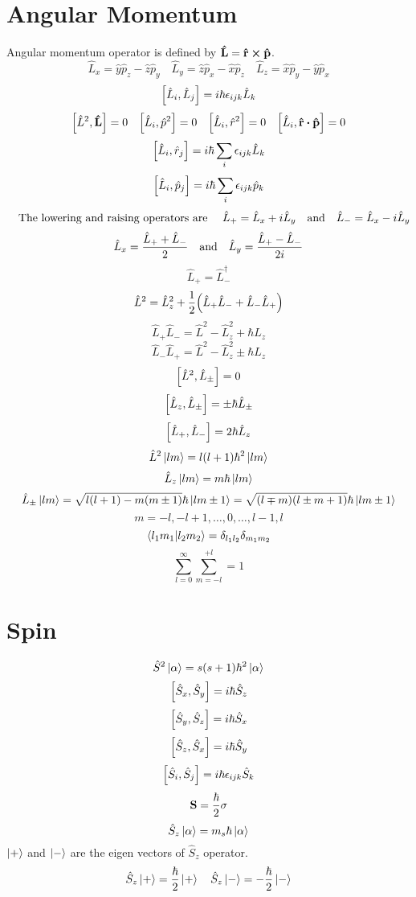 \documentclass[12pt]{article}
\begin{document}
\section{Angular Momentum}
Angular momentum operator is defined by $\vb{\vu{L}}=\vb{\vu{r}}\cp\vb{\vu{p}}$.
\[\hat{L}_x=\hat{y}\hat{p}_z-\hat{z}\hat{p}_y\quad\hat{L}_y=\hat{z}\hat{p}_x-\hat{x}\hat{p}_z\quad\hat{L}_z=\hat{x}\hat{p}_y-\hat{y}\hat{p}_x\]
\[\comm{\hat{L}_i}{\hat{L}_j}=i\hbar\epsilon_{ijk}\hat{L}_k\]
\[\comm{\hat{L}^2}{\vb{\vu{L}}}=0\quad\comm{\hat{L}_i}{\hat{p}^2}=0\quad\comm{\hat{L}_i}{\hat{r}^2}=0\quad\comm{\hat{L}_i}{\vb{\vu{r}}\vdot\vb{\vu{p}}}=0\]
\[\comm{\hat{L}_i}{\hat{r}_j}=i\hbar\sum_{i}\epsilon_{ijk}\hat{L}_k\]
\[\comm{\hat{L}_i}{\hat{p}_j}=i\hbar\sum_{i}\epsilon_{ijk}\hat{p}_k\]
\[\qq{The lowering and raising operators are } \hat{L}_{+}=\hat{L}_x+i\hat{L}_y \qq{and} \hat{L}_{-}=\hat{L}_x-i\hat{L}_y\]
\[\hat{L}_x=\frac{\hat{L}_++\hat{L}_-}{2} \qq{and} \hat{L}_y=\frac{\hat{L}_+-\hat{L}_-}{2i}\]
\[\hat{L}_+=\hat{L}_-^{\dag}\]
\[\hat{L}^2=\hat{L}_z^2+\frac{1}{2}\qty(\hat{L}_+\hat{L}_-+\hat{L}_-\hat{L}_+)\]
\[\hat{L}_+\hat{L}_-=\hat{L}^2-\hat{L}_z^2+\hbar\hat{L}_z\]
\[\hat{L}_-\hat{L}_+=\hat{L}^2-\hat{L}_z^2\pm\hbar\hat{L}_z\]
\[\comm{\hat{L}^2}{\hat{L}_{\pm}}=0\]
\[\comm{\hat{L}_z}{\hat{L}_{\pm}}=\pm\hbar\hat{L}_{\pm}\]
\[\comm{\hat{L}_+}{\hat{L}_-}=2\hbar\hat{L}_z\]
\[\hat{L}^2\ket{lm}=l(l+1)\hbar^2\ket{lm}\]
\[\hat{L}_z\ket{lm}=m\hbar\ket{lm}\]
\[\hat{L}_{\pm}\ket{lm}=\sqrt{l(l+1)-m(m\pm1)}\hbar\ket{lm\pm1}=\sqrt{(l\mp m)(l\pm m+1)}\hbar\ket{lm\pm1}\]
\[m=-l,-l+1,\ldots,0,\ldots,l-1,l\]
\[\braket{l_1m_1}{l_2m_2}=\delta_{l_1l_2}\delta_{m_1m_2}\]
\[\sum_{l=0}^{\infty}\sum_{m=-l}^{+l}=1\]
\section{Spin}
\[\hat{S}^{2}\ket{\alpha}=s(s+1)\hbar^2\ket{\alpha}\]
\[\comm{\hat{S}_{x}}{\hat{S}_{y}}=i\hbar\hat{S}_{z}\]
\[\comm{\hat{S}_{y}}{\hat{S}_{z}}=i\hbar\hat{S}_{x}\]
\[\comm{\hat{S}_{z}}{\hat{S}_{x}}=i\hbar\hat{S}_{y}\]
\[\comm{\hat{S}_{i}}{\hat{S}_{j}}=i\hbar\epsilon_{ijk}\hat{S}_{k}\]
\[\vb{S}=\frac{\hbar}{2}\vb{\sigma}\]
\[\hat{S}_{z}\ket{\alpha}=m_{s}\hbar\ket{\alpha}\]
$\ket{+}$ and $\ket{-}$ are the eigen vectors of $\hat{{S}}_z$ operator.
\[\hat{{S}}_z\ket{+}=\frac{\hbar}{2}\ket{+}\quad\hat{{S}}_z\ket{-}=-\frac{\hbar}{2}\ket{-}\]
\end{document}
